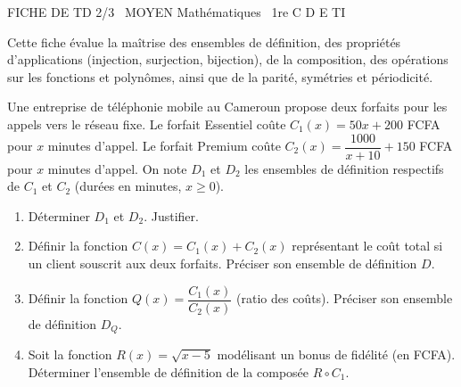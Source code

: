 \documentclass[11pt]{article}
\begin{document}
\begin{tcolorbox}[enhanced,colback=popink,colframe=popink,arc=10pt,boxrule=0pt,left=12pt,right=12pt,top=9pt,bottom=9pt]
{\color{white}\popxbold\small FICHE DE TD 2/3 \textbullet\ MOYEN \hfill Mathématiques \textbullet\ 1re C D E TI\par}
\end{tcolorbox}
\vspace{4pt}
Cette fiche évalue la maîtrise des ensembles de définition, des propriétés d'applications (injection, surjection, bijection), de la composition, des opérations sur les fonctions et polynômes, ainsi que de la parité, symétries et périodicité.

\begin{exercice}
Une entreprise de téléphonie mobile au Cameroun propose deux forfaits pour les appels vers le réseau fixe. 
Le forfait \og{}Essentiel\fg{} coûte $C_1(x) = 50x + 200$ FCFA pour $x$ minutes d'appel.
Le forfait \og{}Premium\fg{} coûte $C_2(x) = \dfrac{1000}{x+10} + 150$ FCFA pour $x$ minutes d'appel.
On note $D_1$ et $D_2$ les ensembles de définition respectifs de $C_1$ et $C_2$ (durées en minutes, $x \ge 0$).
\begin{enumerate}
    \item Déterminer $D_1$ et $D_2$. Justifier.
    \item Définir la fonction $C(x) = C_1(x) + C_2(x)$ représentant le coût total si un client souscrit aux deux forfaits. Préciser son ensemble de définition $D$.
    \item Définir la fonction $Q(x) = \dfrac{C_1(x)}{C_2(x)}$ (ratio des coûts). Préciser son ensemble de définition $D_Q$.
    \item Soit la fonction $R(x) = \sqrt{x - 5}$ modélisant un bonus de fidélité (en FCFA). Déterminer l'ensemble de définition de la composée $R \circ C_1$.
\end{enumerate}
\end{exercice}
\end{document}

